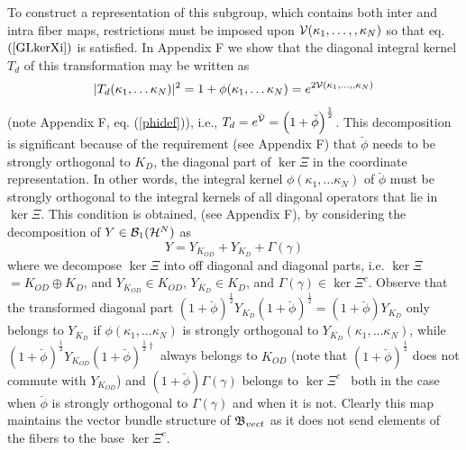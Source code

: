 To construct a representation of this subgroup, which contains both inter
and intra fiber maps, restrictions must be imposed upon ${\cal V}(\kappa
_{1},\ldots ,,\kappa _{N})$ so that eq. $\left( \ref{GLkerXi}\right) $ is
satisfied. In Appendix F we show that the diagonal integral kernel $T_{d}$
of this transformation may be written as 
\begin{equation}
|T_{d}(\kappa _{1},\ldots \kappa _{N})|^{2}=1+\phi (\kappa _{1},\ldots
\kappa _{N})=e^{2{\cal V}(\kappa _{1},\ldots ,,\kappa _{N})}
\end{equation}%
(note Appendix F, eq. (\ref{phidef})), i.e., $T_{d}=e^{\breve{{\cal V}}%
}=\left( 1+\breve{\phi}\right) ^{\frac{1}{2}}$. This decomposition is
significant because of the requirement (see Appendix F) that $\breve{\phi}$
needs to be strongly orthogonal to $K_{D}$, the diagonal part of $\ker \Xi $
in the coordinate representation. In other words, the integral kernel $\phi
(\kappa _{1},\ldots \kappa _{N})$ of $\breve{\phi}$ must be strongly
orthogonal to the integral kernels of all diagonal operators that lie in $%
\ker \Xi $. This condition is obtained, (see Appendix F), by considering the
decomposition of $Y\in {\cal B}_{1}({\cal H}^{N})$ as 
\begin{equation}
Y=Y_{K_{OD}}+Y_{K_{D}}+\Gamma \left( \gamma \right)
\end{equation}%
where we decompose $\ker \Xi $ into off diagonal and diagonal parts, i.e. $%
\ker \Xi $ $=K_{OD}\oplus K_{D}$, and $Y_{K_{OD}}\in K_{OD}$, $Y_{K_{D}}\in
K_{D}$, and $\Gamma \left( \gamma \right) \in \ker \Xi ^{c}$. Observe that
the transformed diagonal part $\left( 1+\breve{\phi}\right) ^{\frac{1}{2}%
}Y_{K_{D}}\left( 1+\breve{\phi}\right) ^{\frac{1}{2}}=\left( 1+\breve{\phi}%
\right) Y_{K_{D}}$ only belongs to $Y_{K_{D}}$ if $\phi \left( \kappa
_{1},\ldots \kappa _{N}\right) $ is strongly orthogonal to $Y_{K_{D}}\left(
\kappa _{1},\ldots \kappa _{N}\right) $, while $\left( 1+\breve{\phi}\right)
^{\frac{1}{2}}Y_{K_{OD}}\left( 1+\breve{\phi}\right) ^{\frac{1}{2}\dagger }$
always belongs to $K_{OD}$ (note that $\left( 1+\breve{\phi}\right) ^{\frac{1%
}{2}}$ does not commute with $Y_{K_{OD}}$) and $\left( 1+\breve{\phi}\right)
\Gamma \left( \gamma \right) $ belongs to $\ker \Xi ^{c\text{ }}$ both in
the case when $\breve{\phi}$ is strongly orthogonal to $\Gamma \left( \gamma
\right) $ and when it is not. Clearly this map maintains the vector bundle
structure of ${\frak B}_{vect}$ as it does not send elements of the fibers
to the base $\ker \Xi ^{c}$.


